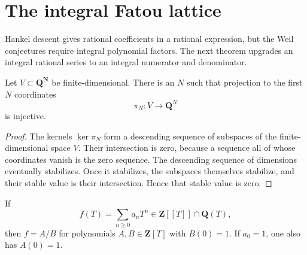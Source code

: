 \section{The integral Fatou lattice}

Hankel descent gives rational coefficients in a rational expression, but
the Weil conjectures require integral polynomial factors.  The next
theorem upgrades an integral rational series to an integral numerator and
denominator.

\begin{lemma}
\label{lem:finite-coordinate-detection}
Let \(V\subset\mathbf Q^{\mathbf N}\) be finite-dimensional.  There is an
\(N\) such that projection to the first \(N\) coordinates
\[
 \pi_N\colon V\longrightarrow\mathbf Q^N
\]
is injective.
\end{lemma}

\begin{proof}
The kernels \(\ker\pi_N\) form a descending sequence of subspaces of the
finite-dimensional space \(V\).  Their intersection is zero, because a
sequence all of whose coordinates vanish is the zero sequence.  The
descending sequence of dimensions eventually stabilizes.  Once it
stabilizes, the subspaces themselves stabilize, and their stable value is
their intersection.  Hence that stable value is zero.
\end{proof}

\begin{theorem}
\label{thm:integral-fatou}
If
\[
 f(T)=\sum_{n\geq0}a_nT^n\in\mathbf Z[[T]]\cap\mathbf Q(T),
\]
then \(f=A/B\) for polynomials \(A,B\in\mathbf Z[T]\) with \(B(0)=1\).
If \(a_0=1\), one also has \(A(0)=1\).
\end{theorem}

